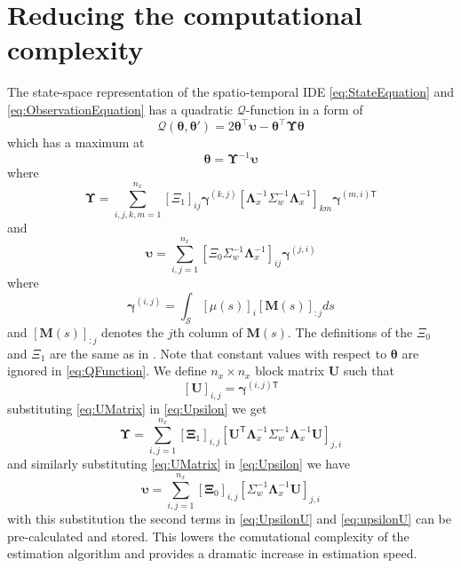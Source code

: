 \documentclass[11pt,draftcls,onecolumn,peerreview]{IEEEtran}
\begin{document}
{{\section*{Reducing the computational complexity}\label{App:ReducedRTS}
The state-space representation of the spatio-temporal IDE \eqref{eq:StateEquation} and \eqref{eq:ObservationEquation} has a quadratic $\mathcal Q$-function in a form of \cite{Dewar2009}
\begin{equation}
\mathcal{Q}\left(\boldsymbol\theta,\boldsymbol\theta'\right)=2 \boldsymbol\theta^\top\boldsymbol\upsilon -\boldsymbol\theta^\top\boldsymbol\Upsilon\boldsymbol\theta
\label{eq:QFunction}
\end{equation}
which has a maximum at
\begin{equation}
 \boldsymbol\theta=\boldsymbol\Upsilon^{-1}\boldsymbol\upsilon
\end{equation}
where
\begin{equation}\label{eq:Upsilon}
 \boldsymbol\Upsilon=\sum_{i,j,k,m=1}^{n_x}\left[ \Xi_1\right] _{ij}\boldsymbol\gamma^{\left(k,j\right)}\left[\boldsymbol\Lambda_{x}^{-1}\Sigma_{w}^{-1} \boldsymbol\Lambda_{x}^{-1}\right]_{km} \boldsymbol\gamma^{\left(m,i\right)\mathsf{T}}
\end{equation}
and
\begin{equation}
 \boldsymbol \upsilon=\sum_{i,j=1}^{n_x}\left[\Xi_0\Sigma_{w}^{-1}\boldsymbol\Lambda_{x}^{-1} \right]_{ij}\boldsymbol\gamma^{\left(j,i\right)} 
\end{equation}
where
\begin{equation}
 \boldsymbol\gamma^{(i,j)}=\int_{\mathcal S}\left[ \mu(s)\right]_i\left[ \mathbf M(s)\right] _{:j}ds
\end{equation}
and $\left[ \mathbf M(s)\right] _{:j}$ denotes the $j$th column of $\mathbf M(s)$. The definitions of the $\Xi_0$ and $\Xi_1$ are the same as in \cite{Dewar2009}. Note that constant values with respect to $\boldsymbol \theta$ are ignored in \eqref{eq:QFunction}.
We define $n_x \times n_x$ block matrix $\mathbf U$ such that
\begin{equation}\label{eq:UMatrix}
 [\mathbf U]_{i,j}=\boldsymbol\gamma^{(i,j)\mathsf{T}}
\end{equation}
substituting \eqref{eq:UMatrix} in \eqref{eq:Upsilon} we get
\begin{equation}\label{eq:UpsilonU}
 \boldsymbol\Upsilon=\sum_{i,j=1}^{n_x}[\boldsymbol\Xi_1]_{i,j}[\mathbf{U}^{\mathsf T} \boldsymbol\Lambda_{x}^{-1}\Sigma_{w}^{-1}\boldsymbol\Lambda_{x}^{-1}\mathbf{U}]_{j,i}
\end{equation}
and similarly substituting \eqref{eq:UMatrix} in \eqref{eq:Upsilon} we have
\begin{equation}\label{eq:upsilonU}
 \boldsymbol\upsilon=\sum_{i,j=1}^{n_x}[\boldsymbol\Xi_0]_{i,j}[\Sigma_{w}^{-1}\boldsymbol\Lambda_{x}^{-1}\mathbf U]_{j,i}
\end{equation}
with this substitution the second terms in \eqref{eq:UpsilonU} and \eqref{eq:upsilonU} can be pre-calculated and stored. This lowers the comutational complexity of the estimation algorithm and provides a dramatic increase in estimation speed.
}}
\end{document}
